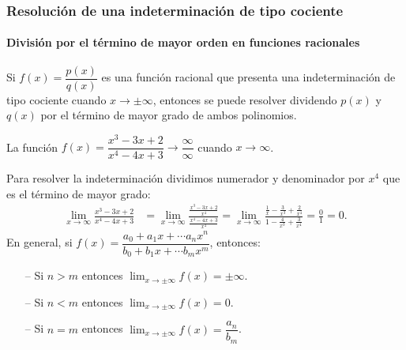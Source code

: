 	
	\begin{frame}
		\frametitle{Resolución de una indeterminación de tipo cociente}
		\framesubtitle{División por el término de mayor orden en funciones racionales}
		Si $f(x)=\dfrac{p(x)}{q(x)}$ es una función racional que presenta una indeterminación de tipo cociente cuando $x\rightarrow \pm\infty$, entonces se puede resolver dividendo $p(x)$ y $q(x)$ por el término de mayor grado de ambos polinomios.
		
		 La función $f(x)=\dfrac{x^3-3x+2}{x^4-4x+3}\rightarrow \dfrac{\infty}{\infty}$ cuando $x\rightarrow \infty$.
		
		Para resolver la indeterminación dividimos numerador y denominador por $x^4$ que es el término de mayor grado:
		\begin{align*}
			\lim_{x\rightarrow \infty}\frac{x^3-3x+2}{x^4-4x+3} & = 
			\lim_{x\rightarrow \infty}\frac{\frac{x^3-3x+2}{x^4}}{\frac{x^4-4x+3}{x^4}} =
			\lim_{x\rightarrow \infty}\frac{\frac{1}{x}-\frac{3}{x^3}+\frac{2}{x^4}}{1-\frac{4}{x^3}+\frac{3}{x^4}} =\frac{0}{1}=0.
		\end{align*}
		En general, si $f(x)=\dfrac{a_0+a_1x+\cdots a_nx^n}{b_0+b_1x+\cdots b_mx^m}$, entonces:
		\begin{itemize}
			\item[--] Si $n>m$ entonces $\lim_{x\rightarrow \pm \infty}f(x)=\pm\infty$.
			\item[--] Si $n<m$ entonces $\lim_{x\rightarrow \pm \infty}f(x)=0$.
			\item[--] Si $n=m$ entonces $\lim_{x\rightarrow \pm \infty}f(x)=\dfrac{a_n}{b_m}$.
		\end{itemize}
	\end{frame}
	
